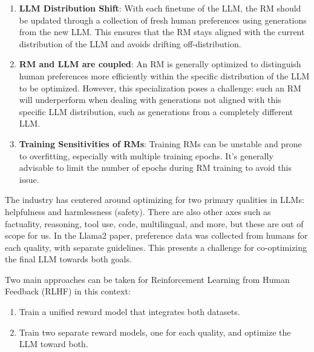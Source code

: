 \documentclass[
  letterpaper,
  numbers=noenddot,
  DIV=11]{scrreprt}
\theoremstyle{definition}
\theoremstyle{plain}
\theoremstyle{plain}
\theoremstyle{remark}
\begin{document}
\begin{enumerate}
\def\labelenumi{\arabic{enumi}.}
\item
  \textbf{LLM Distribution Shift}: With each finetune of the LLM, the RM
  should be updated through a collection of fresh human preferences
  using generations from the new LLM. This ensures that the RM stays
  aligned with the current distribution of the LLM and avoids drifting
  off-distribution.
\item
  \textbf{RM and LLM are coupled}: An RM is generally optimized to
  distinguish human preferences more efficiently within the specific
  distribution of the LLM to be optimized. However, this specialization
  poses a challenge: such an RM will underperform when dealing with
  generations not aligned with this specific LLM distribution, such as
  generations from a completely different LLM.
\item
  \textbf{Training Sensitivities of RMs}: Training RMs can be unstable
  and prone to overfitting, especially with multiple training epochs.
  It's generally advisable to limit the number of epochs during RM
  training to avoid this issue.
\end{enumerate}

The industry has centered around optimizing for two primary qualities in
LLMs: helpfulness and harmlessness (safety). There are also other axes
such as factuality, reasoning, tool use, code, multilingual, and more,
but these are out of scope for us. In the Llama2 paper, preference data
was collected from humans for each quality, with separate guidelines.
This presents a challenge for co-optimizing the final LLM towards both
goals.

Two main approaches can be taken for Reinforcement Learning from Human
Feedback (RLHF) in this context:

\begin{enumerate}
\def\labelenumi{\arabic{enumi}.}
\item
  Train a unified reward model that integrates both datasets.
\item
  Train two separate reward models, one for each quality, and optimize
  the LLM toward both.
\end{enumerate}
\end{document}
